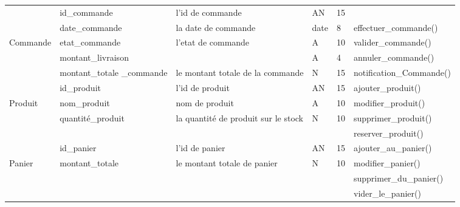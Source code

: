 \documentclass[edit,12pt,a4paper,ChapStyle,oneside,doubleinterligne]{report}
\begin{document}
\begin{table}[H]
    \centering
    \begin{tabular}{ | m{} | m{}| m{3cm} |m{}|m{}|l|}
    \hline
                                          &id\_commande&l'id de commande&AN&15& \\\cline{2-6}
                                          &date\_commande&la date de commande&date&8&effectuer\_commande() \\\cline{2-6}
                                Commande  &etat\_commande&l'etat de commande&A&10&valider\_commande() \\\cline{2-6}
                                          &montant\_livraison&            &A&4&annuler\_commande()\\\cline{2-6}
                                          &montant\_totale \_commande&le montant totale de la commande&N&15&notification\_Commande() \\\hline


                                          &id\_produit&l'id de produit&AN&15&ajouter\_produit() \\\cline{2-6}
                                Produit   &nom\_produit&nom de produit&A&10&modifier\_produit() \\\cline{2-6}
                                          &quantité\_produit&la quantité de produit sur le stock&N&10&supprimer\_produit()\\\cline{2-6}
                                          &                 &                                   & &  &reserver\_produit() \\\hline

                                          &id\_panier&l'id de panier&AN&15&ajouter\_au\_panier() \\\cline{2-6}
                                Panier    &montant\_totale&le montant totale de panier&N&10&modifier\_panier() \\\cline{2-6}
                                          &                 &                         & &  &supprimer\_du\_panier()\\\cline{2-6}
                                          &                 &                         & &  &vider\_le\_panier()\\\hline



\end{tabular}
\end{table}
\end{document}
